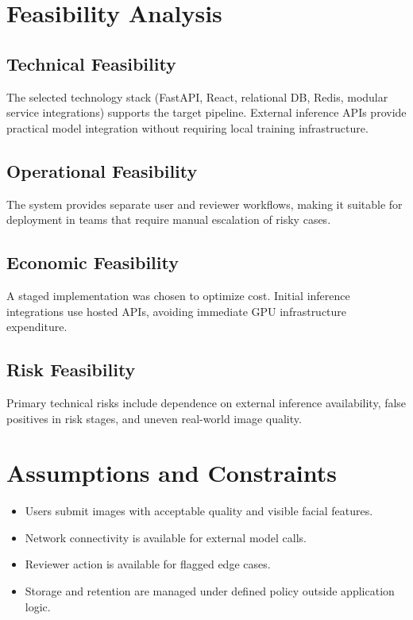 \section{Feasibility Analysis}
\subsection{Technical Feasibility}
The selected technology stack (FastAPI, React, relational DB, Redis, modular service integrations) supports the target pipeline. External inference APIs provide practical model integration without requiring local training infrastructure.

\subsection{Operational Feasibility}
The system provides separate user and reviewer workflows, making it suitable for deployment in teams that require manual escalation of risky cases.

\subsection{Economic Feasibility}
A staged implementation was chosen to optimize cost. Initial inference integrations use hosted APIs, avoiding immediate GPU infrastructure expenditure.

\subsection{Risk Feasibility}
Primary technical risks include dependence on external inference availability, false positives in risk stages, and uneven real-world image quality.

\section{Assumptions and Constraints}
\begin{itemize}
\item Users submit images with acceptable quality and visible facial features.
\item Network connectivity is available for external model calls.
\item Reviewer action is available for flagged edge cases.
\item Storage and retention are managed under defined policy outside application logic.
\end{itemize}

